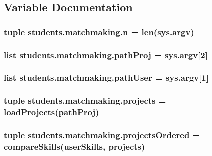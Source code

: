 \subsection{Variable Documentation}
\hypertarget{namespacestudents_1_1matchmaking_a10ddf73615b34b61e24d9570a53eadf8}{
\subsubsection[{n}]{\setlength{\rightskip}{0pt plus 5cm}tuple students.\-matchmaking.\-n = len(sys.\-argv)}}\label{namespacestudents_1_1matchmaking_a10ddf73615b34b61e24d9570a53eadf8}
\hypertarget{namespacestudents_1_1matchmaking_a96ec4d725826c01b8e22d6115967008b}{
\subsubsection[{path\-Proj}]{\setlength{\rightskip}{0pt plus 5cm}list students.\-matchmaking.\-path\-Proj = sys.\-argv\mbox{[}2\mbox{]}}}\label{namespacestudents_1_1matchmaking_a96ec4d725826c01b8e22d6115967008b}
\hypertarget{namespacestudents_1_1matchmaking_a3d4ffe9845e7326e75ef529734ac9e91}{
\subsubsection[{path\-User}]{\setlength{\rightskip}{0pt plus 5cm}list students.\-matchmaking.\-path\-User = sys.\-argv\mbox{[}1\mbox{]}}}\label{namespacestudents_1_1matchmaking_a3d4ffe9845e7326e75ef529734ac9e91}
\hypertarget{namespacestudents_1_1matchmaking_a64150aeb721ef104b626012eacefded6}{
\subsubsection[{projects}]{\setlength{\rightskip}{0pt plus 5cm}tuple students.\-matchmaking.\-projects = {\bf load\-Projects}({\bf path\-Proj})}}\label{namespacestudents_1_1matchmaking_a64150aeb721ef104b626012eacefded6}
\hypertarget{namespacestudents_1_1matchmaking_ad6b6e78ce4d795b130413ee857e4ee91}{
\subsubsection[{projects\-Ordered}]{\setlength{\rightskip}{0pt plus 5cm}tuple students.\-matchmaking.\-projects\-Ordered = {\bf compare\-Skills}({\bf user\-Skills}, {\bf projects})}}\label{namespacestudents_1_1matchmaking_ad6b6e78ce4d795b130413ee857e4ee91}

